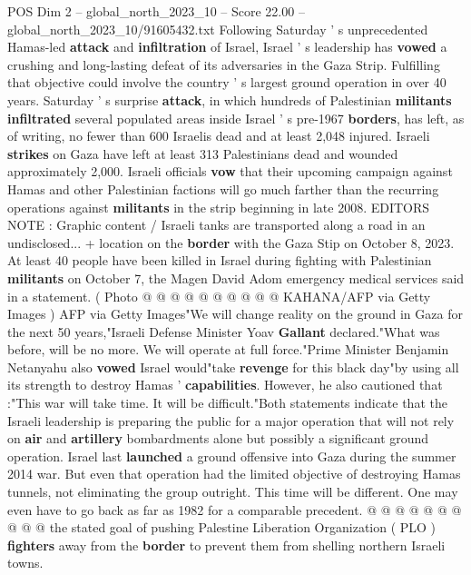 \begin{textsample}{POS Dim 2 – global\_north\_2023\_10 – Score 22.00 – global\_north\_2023\_10/91605432.txt}  \label{ex:f2_pos_149}
Following Saturday ' s unprecedented Hamas-led \textbf{attack} and \textbf{infiltration} of Israel, Israel ' s leadership has \textbf{vowed} a crushing and long-lasting defeat of its adversaries in the Gaza Strip.
Fulfilling that objective could involve the country ' s largest ground operation in over 40 years.
Saturday ' s surprise \textbf{attack}, in which hundreds of Palestinian \textbf{militants} \textbf{infiltrated} several populated areas inside Israel ' s pre-1967 \textbf{borders}, has left, as of writing, no fewer than 600 Israelis dead and at least 2,048 injured.
Israeli \textbf{strikes} on Gaza have left at least 313 Palestinians dead and wounded approximately 2,000.
Israeli officials \textbf{vow} that their upcoming campaign against Hamas and other Palestinian factions will go much farther than the recurring operations against \textbf{militants} in the strip beginning in late 2008.
EDITORS NOTE : Graphic content / Israeli tanks are transported along a road in an undisclosed... + location on the \textbf{border} with the Gaza Stip on October 8, 2023.
At least 40 people have been killed in Israel during fighting with Palestinian \textbf{militants} on October 7, the Magen David Adom emergency medical services said in a statement. ( Photo @ @ @ @ @ @ @ @ @ @ KAHANA/AFP via Getty Images ) AFP via Getty Images"We will change reality on the ground in Gaza for the next 50 years,"Israeli Defense Minister Yoav \textbf{Gallant} declared."What was before, will be no more.
We will operate at full force."Prime Minister Benjamin Netanyahu also \textbf{vowed} Israel would"take \textbf{revenge} for this black day"by using all its strength to destroy Hamas ' \textbf{capabilities}.
However, he also cautioned that :"This war will take time.
It will be difficult."Both statements indicate that the Israeli leadership is preparing the public for a major operation that will not rely on \textbf{air} and \textbf{artillery} bombardments alone but possibly a significant ground operation.
Israel last \textbf{launched} a ground offensive into Gaza during the summer 2014 war.
But even that operation had the limited objective of destroying Hamas tunnels, not eliminating the group outright.
This time will be different.
One may even have to go back as far as 1982 for a comparable precedent. @ @ @ @ @ @ @ @ @ @ the stated goal of pushing Palestine Liberation Organization ( PLO ) \textbf{fighters} away from the \textbf{border} to prevent them from shelling northern Israeli towns.

\end{textsample}
